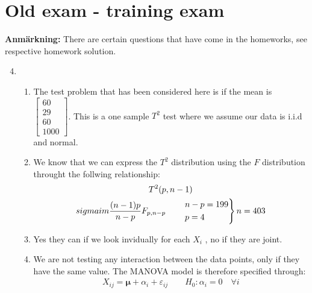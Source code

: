 \section{Old exam - training exam}
\noindent\textbf{Anmärkning:} There are certain questions that have come in the homeworks, see respective homework solution. 
\par\bigskip

\begin{enumerate}[label=\arabic*., leftmargin=*]
  \setcounter{enumi}{3}
  \item
  \begin{enumerate}[label=\alph*),leftmargin=*]
  \item The test problem that has been considered here is if the mean is $\begin{bmatrix}60\\29\\60\\1000\end{bmatrix}$. This is a one sample $T^2$ test where we assume our data is i.i.d and normal.
    \par\bigskip
  \item We know that we can express the $T^2$ distribution using the $F$ distribution throught the follwing relationship:
    \begin{equation*}
      \begin{gathered}
        T^2(p,n-1)\\sigmaim \dfrac{(n-1)p}{n-p}F_{p,n-p}\qquad 
        \begin{rcases*}
          n-p = 199\\p=4
        \end{rcases*}n = 403
      \end{gathered}
    \end{equation*}
    \par\bigskip
  \item Yes they can if we look invidually for each $X_i$ , no if they are joint.
    \par\bigskip
  \item We are not testing any interaction between the data points, only if they have the same value. The MANOVA model is therefore specified through:
    \begin{equation*}
      \begin{gathered}
        X_{ij} = \mathbf{\mu}+\alpha_i+\varepsilon_{ij}\qquad H_0:\alpha_i = 0\quad\forall i
      \end{gathered}
    \end{equation*}

\end{enumerate}
\end{enumerate}
